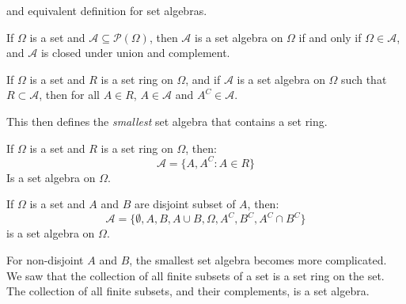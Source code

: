         and equivalent definition for set algebras.
        \begin{theorem}
            If $\Omega$ is a set and
            $\mathcal{A}\subseteq\mathcal{P}(\Omega)$,
            then $\mathcal{A}$ is a set algebra on $\Omega$
            if and only if $\Omega\in\mathcal{A}$, and
            $\mathcal{A}$ is closed under union and
            complement.
        \end{theorem}
        \begin{theorem}
            If $\Omega$ is a set and $R$ is a set ring
            on $\Omega$, and if $\mathcal{A}$ is a set
            algebra on $\Omega$ such that
            $R\subset\mathcal{A}$, then for all $A\in{R}$,
            $A\in\mathcal{A}$ and $A^{C}\in\mathcal{A}$.
        \end{theorem}
        This then defines the \textit{smallest} set algebra
        that contains a set ring.
        \begin{theorem}
            If $\Omega$ is a set and $R$ is a set ring on
            $\Omega$, then:
            \begin{equation}
                \mathcal{A}=\{A,A^{C}:A\in{R}\}
            \end{equation}
            Is a set algebra on $\Omega$.
        \end{theorem}
        \begin{theorem}
            If $\Omega$ is a set and $A$ and $B$ are
            disjoint subset of $A$, then:
            \begin{equation}
                \mathcal{A}=
                    \{\emptyset,A,B,A\cup{B},
                      \Omega,A^{C},B^{C},A^{C}\cap{B}^{C}\}
            \end{equation}
            is a set algebra on $\Omega$.
        \end{theorem}
        For non-disjoint $A$ and $B$, the smallest
        set algebra becomes more complicated. We saw that
        the collection of all finite subsets of a set is
        a set ring on the set. The collection of all finite
        subsets, and their complements, is a set algebra.

